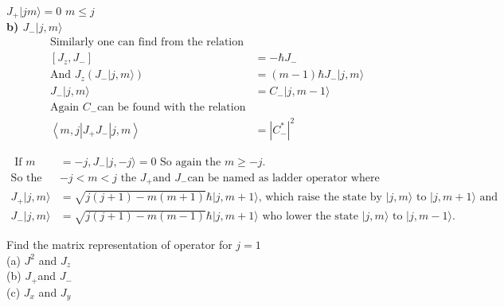  $J_{+}|j  m\rangle=0$\hspace{1cm}
$m \leq j$\\
\textbf{b) \quad $J_{-}|j, m\rangle$}\\
\begin{align*}
\text{Similarly one can find from the relation}\\
\left[ J_z,J_{-}\right] &=-\hbar J_{-}\\
\text{And }J_z( J_{-}|j,m\rangle) &=(m-1)\hbar J_{-}|j,m\rangle\\ J_{-}|j,m\rangle&=C_{-}|j,m-1\rangle\\
\text{Again $C_-$can be found with the relation}\\
\left\langle m, j\left|J_{+} J_{-}\right| j, m\right\rangle&=\left|C_{-}^{*}\right|^{2} 
\end{align*}
	\begin{center}
	\end{center}
\begin{align*}
\text { If } m&=-j, J_{-}|j,-j\rangle=0\text{ So again the }m \geq-j.\\
\text{So the value of }&\text{$-j<m<j$ the $J_{+}$and $J_{-}$can be named as ladder operator where}\\
J_{+}|j, m\rangle&=\sqrt{j(j+1)-m(m+1)} \hbar|j, m+1\rangle\text{, which raise the state by }|j, m\rangle\text{ to $|j, m+1\rangle$ and}\\
J_{-}|j, m\rangle&=\sqrt{j(j+1)-m(m-1)} \hbar|j, m+1\rangle\text{ who lower the state $|j, m\rangle$ to $|j, m-1\rangle .$}
\end{align*}
\begin{exercise}
 Find the matrix representation of operator for $j=1$\\
	(a) $J^{2}$ and $J_{z}$\\
	(b) $J_{+}$and $J_{-}$\\
	(c) $J_{x}$ and $J_{y}$
\end{exercise}
